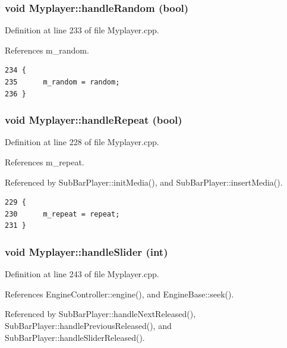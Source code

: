 \subsubsection{\setlength{\rightskip}{0pt plus 5cm}void Myplayer::handle\-Random (bool)\hspace{0.3cm}{\tt  [slot]}}\label{classMyplayer_Myplayeri13}




Definition at line 233 of file Myplayer.cpp.

References m\_\-random.



\footnotesize\begin{verbatim}234 {
235      m_random = random;
236 }
\end{verbatim}\normalsize 
{}
\subsubsection{\setlength{\rightskip}{0pt plus 5cm}void Myplayer::handle\-Repeat (bool)\hspace{0.3cm}{\tt  [slot]}}\label{classMyplayer_Myplayeri12}




Definition at line 228 of file Myplayer.cpp.

References m\_\-repeat.

Referenced by Sub\-Bar\-Player::init\-Media(), and Sub\-Bar\-Player::insert\-Media().



\footnotesize\begin{verbatim}229 {
230      m_repeat = repeat;      
231 }
\end{verbatim}\normalsize 
{}
\subsubsection{\setlength{\rightskip}{0pt plus 5cm}void Myplayer::handle\-Slider (int)\hspace{0.3cm}{\tt  [slot]}}\label{classMyplayer_Myplayeri14}




Definition at line 243 of file Myplayer.cpp.

References Engine\-Controller::engine(), and Engine\-Base::seek().

Referenced by Sub\-Bar\-Player::handle\-Next\-Released(), Sub\-Bar\-Player::handle\-Previous\-Released(), and Sub\-Bar\-Player::handle\-Slider\-Released().



